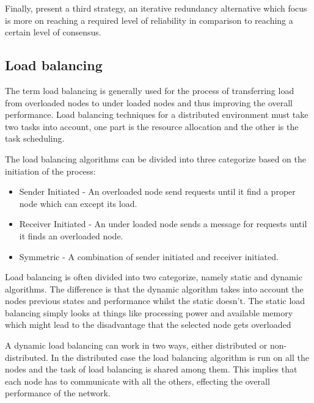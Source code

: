 \documentclass{cslthse-msc}
\begin{document}
Finally, \cite{selfAdaptRel} present a third strategy, an iterative redundancy alternative which focus is more on reaching a required level of reliability in comparison to reaching a certain level of consensus.


\subsection{Load balancing} \label{sec:background_load_balancing}
The term load balancing is generally used for the process of transferring load from overloaded nodes to under loaded nodes and thus improving the overall performance. Load balancing techniques for a distributed environment must take two tasks into account, one part is the resource allocation and the other is the task scheduling. 

The load balancing algorithms can be divided into three categorize based on the initiation of the process:
\begin{itemize}
\item Sender Initiated - An overloaded node send requests until it find a proper node which can except its load.
\item Receiver Initiated - An under loaded node sends a message for requests until it finds an overloaded node.
\item Symmetric - A combination of sender initiated and receiver initiated. 
\end{itemize}

Load balancing is often divided into two categorize, namely static and dynamic algorithms. The difference is that the dynamic algorithm takes into account the nodes previous states and performance whilst the static doesn't. The static load balancing simply looks at things like processing power and available memory which might lead to the disadvantage that the selected node gets overloaded~\cite{perfAnalysisLoadCloud}

\iffalse %
A dynamic load balancing can work in two ways, either distributed or non-distributed. In the distributed case the load balancing algorithm is run on all the nodes and the task of load balancing is shared among them. This implies that each node has to communicate with all the others, effecting the overall performance of the network. %
\end{document}
